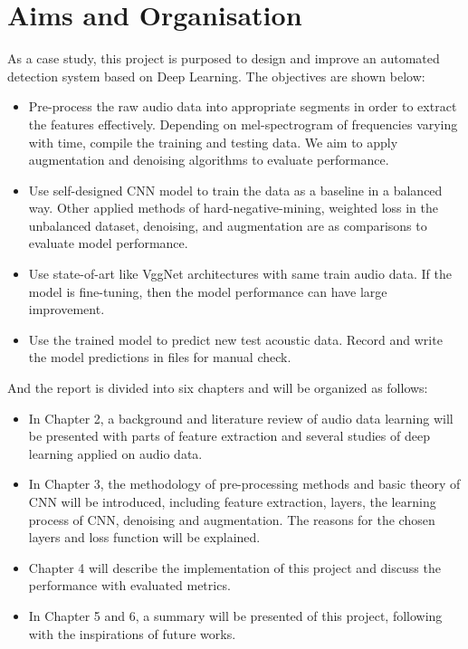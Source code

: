 \section{Aims and Organisation}
As a case study, this project is purposed to design and improve an automated detection system based on Deep Learning. The objectives are shown below:
\begin{itemize}
\item Pre-process the raw audio data into appropriate segments in order to extract the features effectively. Depending on mel-spectrogram of frequencies varying with time, compile the training and testing data. We aim to apply augmentation and denoising algorithms to evaluate performance.
\item Use self-designed CNN model to train the data as a baseline in a balanced way. Other applied methods of hard-negative-mining, weighted loss in the unbalanced dataset, denoising, and augmentation are as comparisons to evaluate model performance.
\item Use state-of-art like VggNet architectures with same train audio data. If the model is fine-tuning, then the model performance can have large improvement.
\item Use the trained model to predict new test acoustic data. Record and write the model predictions in files for manual check.
\end{itemize}
And the report is divided into six chapters and will be organized as follows:
\begin{itemize}
\item In Chapter 2, a background and literature review of audio data learning will be presented with parts of feature extraction and several studies of deep learning applied on audio data.
\item In Chapter 3, the methodology of pre-processing methods and basic theory of CNN will be introduced, including feature extraction, layers, the learning process of CNN, denoising and augmentation. The reasons for the chosen layers and loss function will be explained.
\item Chapter 4 will describe the implementation of this project and discuss the performance with evaluated metrics.
\item In Chapter 5 and 6, a summary will be presented of this project, following with the inspirations of future works.
\end{itemize}

